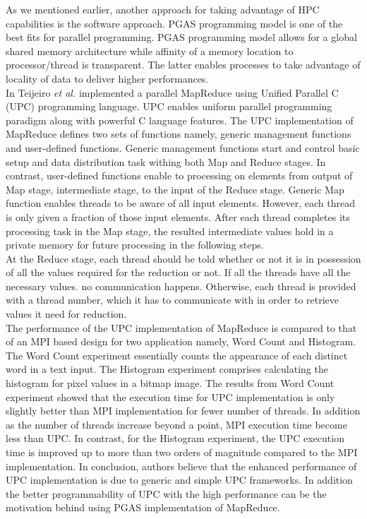 \documentclass[runningheads,a4paper]{llncs}
\begin{document}
{As we mentioned earlier, another approach for taking advantage of HPC capabilities is the software approach. PGAS programming model is one of the best fits for parallel programming. PGAS programming model allows for a global shared memory architecture while affinity of a memory location to processor/thread is transparent. The latter enables processes to take advantage of locality of data to deliver higher performances.\\

In \cite{teijeiro2011design} Teijeiro \textit{et al.} implemented a parallel MapReduce using Unified Parallel C (UPC) \cite{el2006upc} programming language. UPC enables uniform parallel programming paradigm along with powerful C language features. The UPC implementation of MapReduce defines two sets of functions namely, generic management functions and user-defined functions. Generic management functions start and control basic setup and data distribution task withing both Map and Reduce stages. In contrast, user-defined functions enable to processing on elements from output of Map stage, intermediate stage, to the input of the Reduce stage. Generic Map function enables threads to be aware of all input elements. However, each thread is only given a fraction of those input elements. After each thread completes its processing task in the Map stage, the resulted intermediate values hold in a private memory for future processing in the following steps.\\

At the Reduce stage, each thread should be told whether or not it is in possession of all the values required for the reduction or not. If all the threads have all the necessary values. no communication happens. Otherwise, each thread is provided with a thread number, which it has to communicate with in order to retrieve values it need for reduction.\\

The performance of the UPC implementation of MapReduce is compared to that of an MPI based design for two application namely, Word Count and Histogram. The Word Count experiment essentially counts the appearance of each distinct word in a text input. The Histogram experiment comprises calculating the histogram for pixel values in a bitmap image. The results from Word Count experiment showed that the execution time for UPC implementation is only slightly better than MPI implementation for fewer number of threads. In addition as the number of threads increase beyond a point, MPI execution time become less than UPC. In contrast, for the Histogram experiment, the UPC execution time is improved up to more than two orders of magnitude compared to the MPI implementation. In conclusion, authors believe that the enhanced performance of UPC implementation is due to  generic and simple UPC frameworks. In addition the better programmability of UPC with the high performance can be the motivation behind using PGAS implementation of MapReduce. 



}
\end{document}
